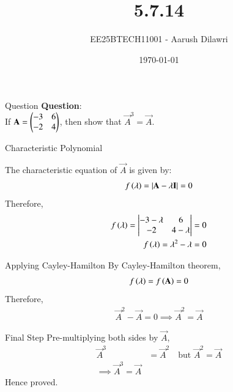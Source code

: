 \documentclass{beamer}
\title{5.7.14}
\date{\today}
\author{EE25BTECH11001 - Aarush Dilawri}
\begin{document}
\frame{\titlepage}

\begin{frame}{Question}
\textbf{Question}:\\
If $\mathbf{A} = \begin{pmatrix}-3 & 6 \\ -2 & 4\end{pmatrix}$, then show that $\vec{A}^3 = \vec{A}$.
\end{frame}

\begin{frame}{Characteristic Polynomial}

The characteristic equation of $\vec{A}$ is given by:
\begin{align}
    f\left(\lambda\right) = \lvert\mathbf{A}-\lambda\mathbf{I}\rvert =0
\end{align}
Therefore,
\begin{align}
    f\left(\lambda\right) = \begin{vmatrix}-3-\lambda & 6 \\ -2 & 4-\lambda\end{vmatrix} =0\\
    f\left(\lambda\right)=\lambda^2 -\lambda =0    
\end{align}
\end{frame}

\begin{frame}{Applying Cayley-Hamilton}
By Cayley-Hamilton theorem,
\begin{align}
    f\left(\lambda\right) = f\left(\mathbf{A}\right) =0
\end{align}
Therefore,
\begin{align}
    \vec{A}^2 - \vec{A} =0
    \implies \vec{A}^2 = \vec{A}
\end{align}
\end{frame}

\begin{frame}{Final Step}
Pre-multiplying both sides by $\vec{A}$,
\begin{align}
    \vec{A}^3 &= \vec{A}^2\quad\text{but $\vec{A}^2 = \vec{A}$}\\
    \implies \vec{A}^3 = \vec{A}
\end{align}
Hence proved.
\end{frame}
\end{document}
